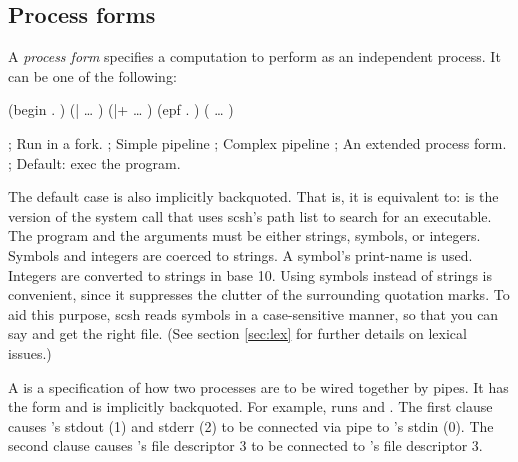 \subsection{Process forms}
A {\em process form\/} specifies a computation to perform as an independent
{\Unix} process. It can be one of the following:
%
\begin{leftinset}
\begin{codebox}
(begin . )     
(|  {\ldots} )          
(|+   {\ldots} )      
(epf . )                       
(  {\ldots} )       
\end{codebox}
\qquad
\begin{codebox}
; Run  in a fork.
; Simple pipeline
; Complex pipeline
; An extended process form.
; Default: exec the program.
\end{codebox}
\end{leftinset}
%
The default case  
is also implicitly backquoted.
That is, it is equivalent to:
%
%
 is the version of the  system call that 
uses scsh's path list to search for an executable.
The program and the arguments must be either strings, symbols, or integers.
Symbols and integers are coerced to strings.
A symbol's print-name is used.
Integers are converted to strings in base 10.
Using symbols instead of strings is convenient, since it suppresses the
clutter of the surrounding  quotation marks.
To aid this purpose, scsh reads symbols in a case-sensitive manner, 
so that you can say
and get the right file.
(See section \ref{sec:lex} for further details on lexical issues.)

A  is a specification of how two processes are to be wired
together by pipes. 
It has the form 
and is implicitly backquoted.
For example,
%
%
runs  and . 
The first clause  causes 's 
stdout (1) and stderr (2) to be connected via pipe 
to 's stdin (0). 
The second clause  causes 's file descriptor 3 to be
connected to 's file descriptor 3.

